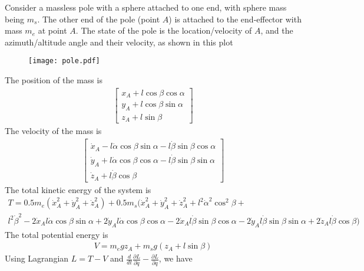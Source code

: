 \documentclass{article}
\begin{document}
Consider a massless pole with a sphere attached to one end, with sphere mass being $m_s$. The other end of the pole (point $A$) is attached to the end-effector with mass $m_e$ at point $A$. The state of the pole is the location/velocity of $A$, and the azimuth/altitude angle and their velocity, as shown in this plot

\begin{figure}
	\centering
	\texttt{[image: pole.pdf]}
\end{figure}

The position of the mass is
\begin{align}
	\begin{bmatrix}
		x_A + l\cos\beta\cos\alpha\\
		y_A + l\cos\beta\sin\alpha\\
		z_A + l\sin\beta
	\end{bmatrix}
\end{align}
The velocity of the mass is
\begin{align}
	\begin{bmatrix}
		\dot{x}_A - l\dot{\alpha}\cos\beta\sin\alpha - l\dot{\beta}\sin\beta\cos\alpha\\
		\dot{y}_A + l\dot{\alpha}\cos\beta\cos\alpha - l\dot{\beta}\sin\beta\sin\alpha\\
		\dot{z}_A + l\dot{\beta}\cos\beta
	\end{bmatrix}
\end{align}
The total kinetic energy of the system is
\begin{multline}
	T = 0.5 m_e (\dot{x}_A^2 + \dot{y}_A^2 +\dot{z}_A^2) + 0.5 m_s(\dot{x}_A^2 + \dot{y}_A^2 + \dot{z}_A^2 + l^2\dot{\alpha}^2\cos^2\beta +\\
	l^2\dot{\beta}^2 - 2\dot{x}_Al\dot{\alpha}\cos\beta\sin\alpha + 2\dot{y}_Al\dot{\alpha}\cos\beta\cos\alpha - 2\dot{x}_Al\dot{\beta}\sin\beta\cos\alpha - 2\dot{y}_Al\dot{\beta}\sin\beta\sin\alpha + 2\dot{z}_Al\dot{\beta}\cos\beta) 
\end{multline}
The total potential energy is
\begin{align}
	V = m_egz_A + m_sg(z_A + l\sin\beta)
\end{align}
Using Lagrangian $L = T-V$ and $\frac{d}{dt}\frac{\partial L}{\partial \dot{q}}-\frac{\partial L}{\partial q}$, we have
\end{document}
